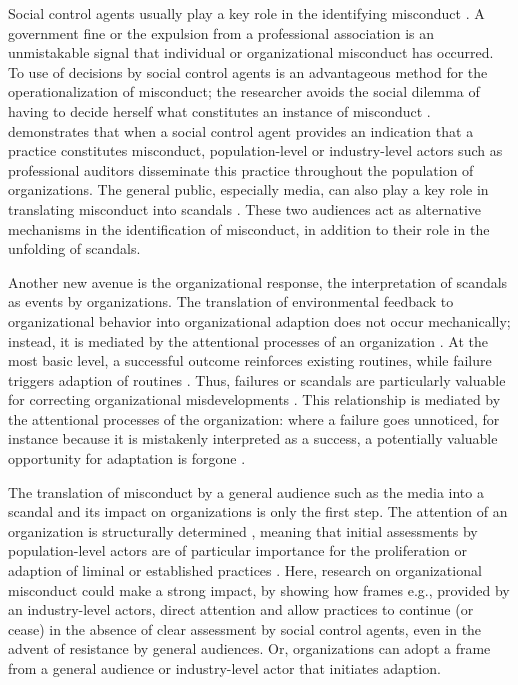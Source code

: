 Social control agents usually play a key role in the identifying misconduct \citep{Greve2010, Palmer2008, Schnatterly2018}. A government fine or the expulsion from a professional association is an unmistakable signal that individual or organizational misconduct has occurred. To use of decisions by social control agents is an advantageous method for the operationalization of misconduct; the researcher avoids the social dilemma of having to decide herself what constitutes an instance of misconduct \citep[e.g.,][]{Pontikes2010}. \citet{Mohliver2019} demonstrates that when a social control agent provides an indication that a practice constitutes misconduct, population-level or industry-level actors \citep{Madsen2018} such as professional auditors disseminate this practice throughout the population of organizations. The general public, especially media, can also play a key role in translating misconduct into scandals \citet{Piazza2018, Hoffman1999}. These two audiences act as alternative mechanisms in the identification of misconduct, in addition to their role in the unfolding of scandals.

Another new avenue is the organizational response, the interpretation of scandals as events by organizations. The translation of environmental feedback to organizational behavior into organizational adaption \citep{Cyert1963} does not occur mechanically; instead, it is mediated by the attentional processes of an organization \citep{Hoffman2001, Ocasio1997}. At the most basic level, a successful outcome reinforces existing routines, while failure triggers adaption of routines \citep{Levitt1988}. Thus, failures or scandals are particularly valuable for correcting organizational misdevelopments \citep{March1992}. This relationship is mediated by the attentional processes of the organization: where a failure goes unnoticed, for instance because it is mistakenly interpreted as a success, a potentially valuable opportunity for adaptation \citep{Carroll1998} is forgone \citep{Dillon2008}.

The translation of misconduct by a general audience such as the media into a scandal and its impact on organizations is only the first step. The attention of an organization is structurally determined \citep{Hoffman2001}, meaning that initial assessments by population-level actors are of particular importance for the proliferation or adaption of liminal or established practices \citep{Mohliver2019, Madsen2018}. Here, research on organizational misconduct could make a strong impact, by showing how frames e.g., provided by an industry-level actors, direct attention and allow practices to continue (or cease) in the absence of clear assessment by social control agents, even in the advent of resistance by general audiences. Or, organizations can adopt a frame from a general audience or industry-level actor that initiates adaption.